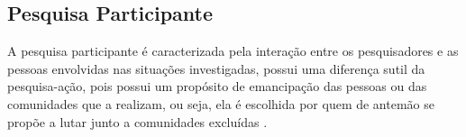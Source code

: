 \newpage

\subsection{Pesquisa Participante}
A pesquisa participante é caracterizada pela interação entre os pesquisadores e as pessoas envolvidas nas situações investigadas, possui uma diferença sutil da pesquisa-ação, pois possui um propósito de emancipação das pessoas ou das comunidades que a realizam, ou seja, ela é escolhida por quem de antemão se propõe a lutar junto a comunidades excluídas \cite{gilNovaes}.

